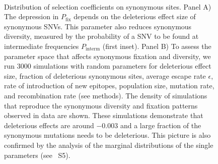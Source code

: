 \documentclass[11pt]{article}
\newcommand{\pfix}{P_{\mathrm{fix}}}
\newcommand{\marginals}{5}
\begin{document}
\begin{figure}
\begin{center}
\\
\caption{Distribution of selection coefficients on synonymous sites. Panel A)
The depression in $\pfix$ depends on the deleterious effect size 
of synonymous SNVs. This parameter also reduces synonymous
diversity, measured by the probability of a SNV to be found at
intermediate frequencies $P_\text{interm}$ (first inset).
Panel B) To assess the parameter space that affects synonymous fixation and
diversity, we run 3000 simulations with random parameters for deleterious effect
size, fraction of deleterious synonymous sites, average escape rate $\epsilon$,
rate of introduction of new epitopes, population size, mutation rate, and
recombination rate (see methods). The density of simulations that reproduce
the synonymous diversity and fixation patterns observed in data are shown.
These simulations demonstrate that deleterious effects are around $-0.003$
and a large fraction of the synonymous mutations needs to be deleterious. This
picture is also confirmed by the analysis of the marginal distributions of the
single parameters (see \figurename~S\marginals).}
\label{fig:simheat}
\end{center}
\end{figure}

%
\end{document}
